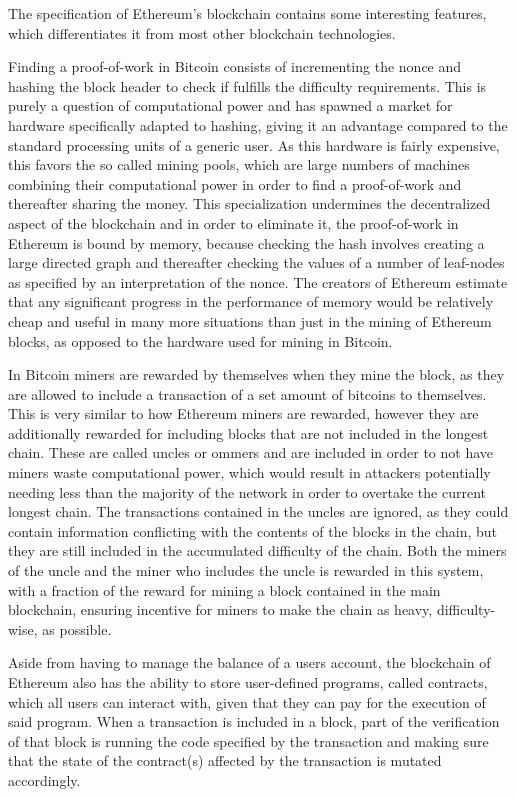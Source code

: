 \documentclass{article}
\begin{document}
		The specification of Ethereum's blockchain\cite{yellow-paper, ethereum-white-paper} contains some interesting features, which differentiates it from most other blockchain technologies.
		
		Finding a proof-of-work in Bitcoin consists of incrementing the nonce and hashing the block header to check if fulfills the difficulty requirements. This is purely a question of computational power and has spawned a market for hardware specifically adapted to hashing, giving it an advantage compared to the standard processing units of a generic user. 
		As this hardware is fairly expensive, this favors the so called mining pools, which are large numbers of machines combining their computational power in order to find a proof-of-work and thereafter sharing the money. 
		This specialization undermines the decentralized aspect of the blockchain and in order to eliminate it, the proof-of-work in Ethereum is bound by memory, because checking the hash involves creating a large directed graph and thereafter checking the values of a number of leaf-nodes as specified by an interpretation of the nonce. 
		The creators of Ethereum estimate that any significant progress in the performance of memory would be relatively cheap and useful in many more situations than just in the mining of Ethereum blocks, as opposed to the hardware used for mining in Bitcoin.

		In Bitcoin miners are rewarded by themselves when they mine the block, as they are allowed to include a transaction of a set amount of bitcoins to themselves. 
		This is very similar to how Ethereum miners are rewarded, however they are additionally rewarded for including blocks that are not included in the longest chain.
		These are called uncles or ommers and are included in order to not have miners waste computational power, which would result in attackers potentially needing less than the majority of the network in order to overtake the current longest chain. 
		The transactions contained in the uncles are ignored, as they could contain information conflicting with the contents of the blocks in the chain, but they are still included in the accumulated difficulty of the chain. 
		Both the miners of the uncle and the miner who includes the uncle is rewarded in this system, with a fraction of the reward for mining a block contained in the main blockchain, ensuring incentive for miners to make the chain as heavy, difficulty-wise, as possible.

		Aside from having to manage the balance of a users account, the blockchain of Ethereum also has the ability to store user-defined programs, called contracts, which all users can interact with, given that they can pay for the execution of said program. 
		When a transaction is included in a block, part of the verification of that block is running the code specified by the transaction and making sure that the state of the contract(s) affected by the transaction is mutated accordingly.
\end{document}
